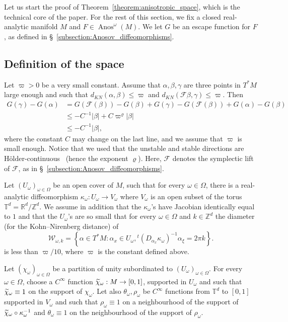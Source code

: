 \documentclass[AHL,Unicode,longabstracts,published]{cedram}
\DeclareMathOperator{\Anos}{Anos}
\newcommand{\set}[1]{\left\{ #1 \right\}}
\newcommand{\va}[1]{\left|#1\right|}
\newcommand{\clF}{\mathcal{F}}
\newcommand{\clW}{\mathcal{W}}
\newcommand{\bbZ}{\mathbb{Z}}
\newcommand{\bbT}{\mathbb{T}}
\newcommand{\bbR}{\mathbb{R}}
\let\oldtilde\tilde
\renewcommand*{\tilde}[1]{\mathchoice{\widetilde{#1}}{\widetilde{#1}}{\oldtilde{#1}}{\oldtilde{#1}}}
\begin{document}
Let us start the proof of Theorem~\ref{theorem:anisotropic_space}, which is the technical core of the paper. For the rest of this section, we fix a closed real-analytic manifold $M$ and $F \in \Anos^\omega(M)$. We let $G$ be an escape function for $F$, as defined in \S~\ref{subsection:Anosov_diffeomorphisms}.

\subsection{Definition of the space}

Let $\varpi > 0$ be a very small constant. Assume that $\alpha,\beta,\gamma$ are three points in $T^* M$ large enough and such that $d_{KN}(\alpha,\beta) \leq \varpi$ and $d_{KN}(\clF \beta,\gamma) \leq \varpi$. Then
\begin{equation}\label{eq:approximate_decay}
\begin{split}
G(\gamma) - G(\alpha) & = G(\clF(\beta)) - G(\beta) + G(\gamma) - G(\clF(\beta)) + G(\alpha) - G(\beta) \\
& \leq - C^{-1} \va{\beta} + C \varpi^\varrho \va{\beta} \\
& \leq - C^{-1} \va{\beta},
\end{split}
\end{equation}
where the constant $C$ may change on the last line, and we assume that $\varpi$ is small enough. Notice that we used that the unstable and stable directions are Hölder-continuous~\cite[Theorem~6.3]{hirsch_pugh} (hence the exponent $\varrho$). Here, $\clF$ denotes the symplectic lift of $\clF$, as in \S~\ref{subsection:Anosov_diffeomorphisms}.

Let $(U_\omega)_{\omega \in \Omega}$ be an open cover of $M$, such that for every $\omega \in \Omega$, there is a real-analytic diffeomorphism $\kappa_\omega : U_\omega \to V_\omega$ where $V_\omega$ is an open subset of the torus $\bbT^d = \bbR^d / \bbZ^d$. We assume in addition that the $\kappa_\omega$'s have Jacobian identically equal to $1$ and that the $U_\omega$'s are so small that for every $\omega \in \Omega$ and $k \in \bbZ^d$ the diameter (for the Kohn--Nirenberg distance) of
\begin{equation*}
\clW_{\omega,k} = \set{\alpha \in T^* M : \alpha_x \in U_\omega, {}^t (D_{\alpha_x} \kappa_\omega)^{-1} \alpha_\xi = 2 \pi k}.
\end{equation*}
is less than $\varpi / 10$, where $\varpi$ is the constant defined above.

Let $(\chi_\omega)_{\omega \in \Omega}$ be a partition of unity subordinated to $(U_\omega)_{\omega \in \Omega}$. For every $\omega \in \Omega$, choose a $C^\infty$ function $\tilde{\chi}_\omega : M \to [0,1]$, supported in $U_\omega$ and such that $\tilde{\chi}_\omega \equiv 1$ on the support of $\chi_\omega$. Let also $\theta_\omega,\rho_\omega$ be $C^\infty$ functions from $\bbT^d$ to $[0,1]$ supported in $V_\omega$ and such that $\rho_\omega \equiv 1$ on a neighbourhood of the support of $\tilde{\chi}_\omega \circ \kappa_\omega^{-1}$ and $\theta_\omega \equiv 1$ on the neighbourhood of the support of $\rho_\omega$.
\end{document}
